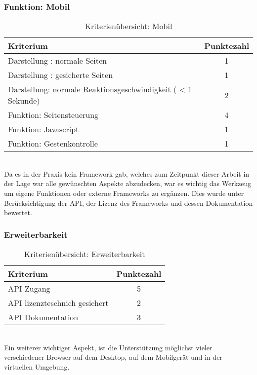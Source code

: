 \subsubsection{Funktion: Mobil}
\begin{table}[H]
 	\vspace{-30pt}
 	\centering
		\begin{tabular}{| p{12cm} | c|}
			\hline
				Kriterium		 &	Punktezahl\\
			\hline
			\hline
				Darstellung : normale Seiten			&1\\
				Darstellung : gesicherte Seiten		&	1	\\
				 Darstellung: normale Reaktionsgeschwindigkeit ( < 1 Sekunde)	&	2	\\
				Funktion: Seitensteuerung			&	4	\\
				Funktion: Javascript			&	1	\\
				Funktion: Gestenkontrolle			&	1	\\
				\hline
		\end{tabular}
	\caption{Kriterienübersicht: Mobil}
\end{table}

\\Da es in der Praxis kein Framework gab, welches zum Zeitpunkt dieser Arbeit in der Lage war alle gewünschten Aspekte abzudecken, war es wichtig das Werkzeug um eigene Funktionen oder externe Frameworks zu ergänzen. Dies wurde unter Berücksichtigung der API, der Lizenz des Frameworks und dessen Dokumentation bewertet.
\subsubsection{Erweiterbarkeit}
\begin{table}[H]
 	\vspace{-30pt}
 	\centering
		\begin{tabular}{| p{12cm} | c|}
			\hline
				Kriterium		 &	Punktezahl\\
			\hline
			\hline
				API Zugang			&5\\
				API lizenzteschnich gesichert	&	2	\\
				API Dokumentation	&	3	\\
				\hline
		\end{tabular}
	\caption{Kriterienübersicht: Erweiterbarkeit}
\end{table}

\\Ein weiterer wichtiger Aspekt, ist die Unterstützung möglichst vieler verschiedener Browser auf dem Desktop, auf dem Mobilgerät und in der virtuellen Umgebung.

